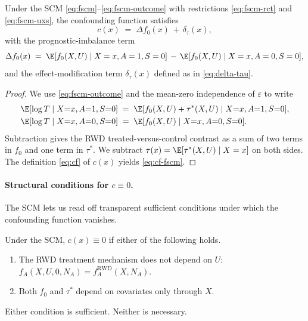 \begin{proposition}\label{prop:cf-fscm}
Under the SCM \eqref{eq:fscm}--\eqref{eq:fscm-outcome} with restrictions \eqref{eq:fscm-rct} and \eqref{eq:fscm-uxs}, the confounding function satisfies
\begin{equation}
c(x) \;=\; \Delta f_0(x) \,+\, \delta_\tau(x),
\label{eq:cf-fscm}
\end{equation}
with the prognostic-imbalance term
\begin{equation}
\Delta f_0(x) \;=\; \E[f_0(X, U) \mid X = x, A = 1, S = 0] \,-\, \E[f_0(X, U) \mid X = x, A = 0, S = 0],
\label{eq:fscm-delta-f0}
\end{equation}
and the effect-modification term $\delta_\tau(x)$ defined as in \eqref{eq:delta-tau}.
\end{proposition}

\begin{proof}
We use \eqref{eq:fscm-outcome} and the mean-zero independence of $\varepsilon$ to write
\begin{align*}
\E[\log T \mid X{=}x, A{=}1, S{=}0]
  &\;=\; \E[f_0(X, U) + \tau^*(X, U) \mid X{=}x, A{=}1, S{=}0],\\
\E[\log T \mid X{=}x, A{=}0, S{=}0]
  &\;=\; \E[f_0(X, U) \mid X{=}x, A{=}0, S{=}0].
\end{align*}
Subtraction gives the RWD treated-versus-control contrast as a sum of two terms in $f_0$ and one term in $\tau^*$.
We subtract $\tau(x) = \E[\tau^*(X, U) \mid X = x]$ on both sides.
The definition \eqref{eq:cf} of $c(x)$ yields \eqref{eq:cf-fscm}.
\end{proof}

\paragraph{Structural conditions for $c \equiv 0$.}
The SCM lets us read off transparent sufficient conditions under which the confounding function vanishes.

\begin{corollary}\label{cor:c-zero-fscm}
Under the SCM, $c(x) \equiv 0$ if either of the following holds.
\begin{enumerate}[label=\textup{(\roman*)}]
\item The RWD treatment mechanism does not depend on $U$:
$f_A(X, U, 0, N_A) = f_A^{\mathrm{RWD}}(X, N_A)$.
\item Both $f_0$ and $\tau^*$ depend on covariates only through $X$.
\end{enumerate}
Either condition is sufficient. Neither is necessary.
\end{corollary}

